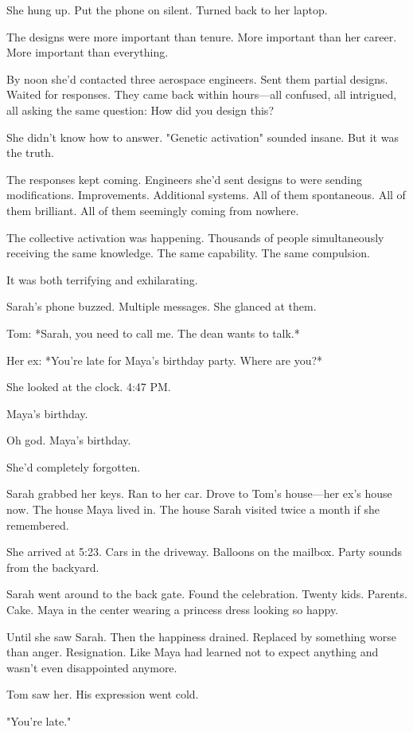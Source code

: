 She hung up. Put the phone on silent. Turned back to her laptop.

The designs were more important than tenure. More important than her career. More important than everything.

By noon she'd contacted three aerospace engineers. Sent them partial designs. Waited for responses. They came back within hours—all confused, all intrigued, all asking the same question: How did you design this?

She didn't know how to answer. "Genetic activation" sounded insane. But it was the truth.

The responses kept coming. Engineers she'd sent designs to were sending modifications. Improvements. Additional systems. All of them spontaneous. All of them brilliant. All of them seemingly coming from nowhere.

The collective activation was happening. Thousands of people simultaneously receiving the same knowledge. The same capability. The same compulsion.

It was both terrifying and exhilarating.

Sarah's phone buzzed. Multiple messages. She glanced at them.

Tom: *Sarah, you need to call me. The dean wants to talk.*

Her ex: *You're late for Maya's birthday party. Where are you?*

She looked at the clock. 4:47 PM.

Maya's birthday.

Oh god. Maya's birthday.

She'd completely forgotten.

Sarah grabbed her keys. Ran to her car. Drove to Tom's house—her ex's house now. The house Maya lived in. The house Sarah visited twice a month if she remembered.

She arrived at 5:23. Cars in the driveway. Balloons on the mailbox. Party sounds from the backyard.

Sarah went around to the back gate. Found the celebration. Twenty kids. Parents. Cake. Maya in the center wearing a princess dress looking so happy.

Until she saw Sarah. Then the happiness drained. Replaced by something worse than anger. Resignation. Like Maya had learned not to expect anything and wasn't even disappointed anymore.

Tom saw her. His expression went cold.

"You're late."

